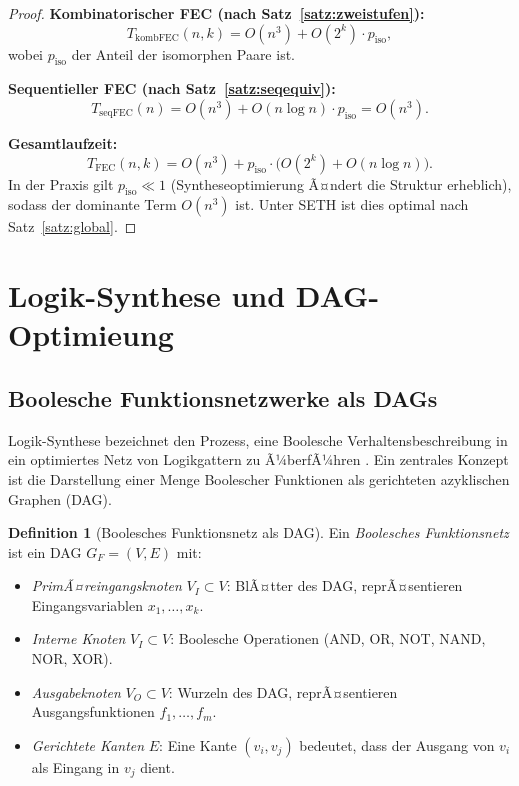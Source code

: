 ﻿\documentclass[a4paper,12pt]{article}
\theoremstyle{definition}
\newtheorem{definition}{Definition}
\begin{document}
\begin{proof}
  \textbf{Kombinatorischer FEC (nach Satz~\ref{satz:zweistufen}):}
  \[
    T_{\text{kombFEC}}(n, k) = O(n^3) + O(2^k) \cdot p_{\text{iso}},
  \]
  wobei $p_{\text{iso}}$ der Anteil der isomorphen Paare ist.

  \textbf{Sequentieller FEC (nach Satz~\ref{satz:seqequiv}):}
  \[
    T_{\text{seqFEC}}(n) = O(n^3) + O(n \log n) \cdot p_{\text{iso}} = O(n^3).
  \]

  \textbf{Gesamtlaufzeit:}
  \[
    T_{\text{FEC}}(n, k) = O(n^3) + p_{\text{iso}} \cdot \bigl(O(2^k) + O(n \log n)\bigr).
  \]
  In der Praxis gilt $p_{\text{iso}} \ll 1$ (Syntheseoptimierung Ã¤ndert die Struktur
  erheblich), sodass der dominante Term $O(n^3)$ ist. Unter SETH ist dies optimal nach
  Satz~\ref{satz:global}.
\end{proof}

\section{Logik-Synthese und DAG-Optimieung}

\subsection{Boolesche Funktionsnetzwerke als DAGs}

Logik-Synthese bezeichnet den Prozess, eine Boolesche Verhaltensbeschreibung in ein
optimiertes Netz von Logikgattern zu Ã¼berfÃ¼hren \cite[Kap.~6]{ciletti2011}. Ein zentrales
Konzept ist die Darstellung einer Menge Boolescher Funktionen als gerichteten azyklischen
Graphen (DAG).

\begin{definition}[Boolesches Funktionsnetz als DAG]
  Ein \emph{Boolesches Funktionsnetz} ist ein DAG $G_F = (V, E)$ mit:
  \begin{itemize}
    \item \emph{PrimÃ¤reingangsknoten} $V_I \subset V$: BlÃ¤tter des DAG, reprÃ¤sentieren
          Eingangsvariablen $x_1, \ldots, x_k$.
    \item \emph{Interne Knoten} $V_I \subset V$: Boolesche Operationen
          (AND, OR, NOT, NAND, NOR, XOR).
    \item \emph{Ausgabeknoten} $V_O \subset V$: Wurzeln des DAG, reprÃ¤sentieren
          Ausgangsfunktionen $f_1, \ldots, f_m$.
    \item \emph{Gerichtete Kanten} $E$: Eine Kante $(v_i, v_j)$ bedeutet, dass der
          Ausgang von $v_i$ als Eingang in $v_j$ dient.
  \end{itemize}
\end{definition}
\end{document}
